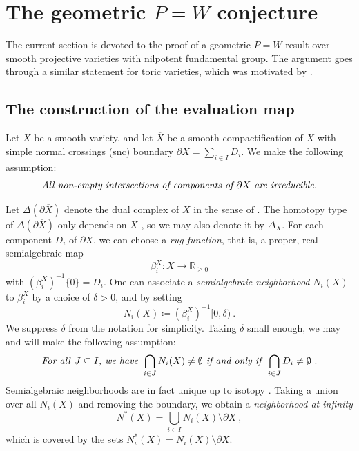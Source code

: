 \documentclass[11pt, a4paper]{amsart}
\theoremstyle{definition}
\theoremstyle{myitemstyle}
\newcommand{\R}{\mathbb{R}}
\begin{document}

\section{The geometric $P=W$ conjecture}
\label{sec:geometric P=W}
The current section is devoted to the proof of a  geometric $P=W$ result over smooth projective varieties with nilpotent fundamental group. The argument goes through a similar statement for toric varieties, which was motivated by \cite{MMS_geometricP=W}.  

\subsection{The construction of the  evaluation map}
\label{sec:evaluation map}
Let $X$ be a smooth variety, and let $\overline X$ be a smooth compactification of $X$ with simple normal crossings (snc) boundary $\partial X=\sum_{i\in I}D_i$. We make the following assumption:
\begin{equation}
\label{eq:irrecubile condition}
     \text{\emph{All non-empty intersections of components of $\partial X$ are irreducible.}}
\end{equation}
    
Let $\Delta(\partial \overline X)$ denote the dual complex of $X$ in the sense of \cite{dFKX17}. The homotopy type of $\Delta(\partial \overline X)$ only depends on $X$ \cite{dFKX17}, so we may also denote it by $\Delta_X$.  For each component $D_i$ of $\partial X$, we can choose a \emph{rug function}, that is, a proper, real semialgebraic map
\[
    \beta^X_i\colon \overline X\to \R_{\geq 0}
\]
with $(\beta^X_i)^{-1}\{0\}=D_i$. One can associate a \emph{semialgebraic neighborhood} $N_i(X)$ to $\beta_i^X$ by a choice of $\delta>0$,  and by setting 
\[
N_i(X) \coloneqq (\beta^X_i)^{-1}[0, \delta)\ .
\]
We suppress $\delta$ from the notation for simplicity. Taking $\delta$ small enough, we may and will  make the following assumption:
\begin{equation}
\label{eq:condition dual complex}
 \text{\emph{For all }} J\subseteq I\text{\emph{, we have }}\bigcap_{i\in J} N_i(X) \neq \emptyset \text{\emph{ if and only if }} \bigcap_{i\in J} D_i\neq \emptyset\ .
\end{equation}
Semialgebraic neighborhoods are in fact unique up to isotopy \cite[Proposition 3.5]{Durfee_neighborhoods}.
Taking a union over all $N_i(X)$ and removing the boundary, we obtain a \emph{neighborhood at infinity }
\[
    N^*(X)= \bigcup_{i\in I} N_i(X) \setminus \partial X \ , 
\]
which is covered by the sets $N^*_i(X)= N_i(X)\setminus \partial X$.
\end{document}
